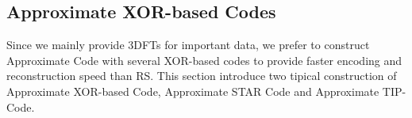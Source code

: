 \documentclass[sigconf]{acmart}
\begin{document}
\subsection{Approximate XOR-based Codes}
Since we mainly provide 3DFTs for important data, we prefer to construct Approximate Code with several XOR-based codes to provide faster encoding and reconstruction speed than RS. This section introduce two tipical construction of Approximate XOR-based Code, Approximate STAR Code and Approximate TIP-Code.

\begin{figure}[ht]
\centering
{}


\end{figure}
\end{document}
